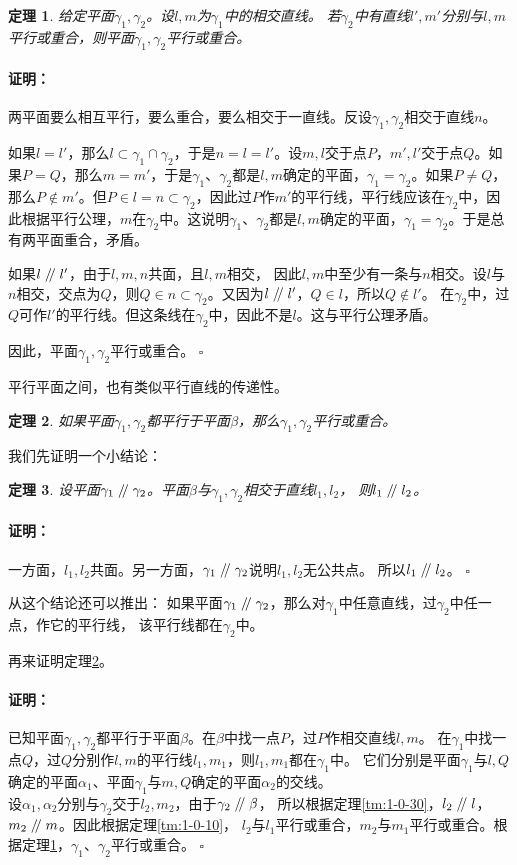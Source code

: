 \documentclass[12pt,UTF8]{ctexbook}
\newtheorem{tm}{定理}[section]
\renewenvironment{proof}{\paragraph{\textbf{证明：}}}{\hfill$\square$}
\renewcommand\parallel{\mathrel{/\mskip-4mu/}}
\begin{document}
\begin{tm}\label{tm:1-0-70}
    给定平面$\gamma_1, \gamma_2$。设$l,m$为$\gamma_1$中的相交直线。
    若$\gamma_2$中有直线$l',m'$分别与$l,m$平行或重合，则平面$\gamma_1, \gamma_2$平行或重合。
\end{tm}
\begin{proof}
    两平面要么相互平行，要么重合，要么相交于一直线。反设$\gamma_1, \gamma_2$相交于直线$n$。

    如果$l=l'$，那么$l\subset \gamma_1\cap\gamma_2$，于是$n=l=l'$。设$m,l$交于点$P$，$m',l'$交于点$Q$。如果$P=Q$，那么$m=m'$，于是$\gamma_1$、$\gamma_2$都是$l,m$确定的平面，$\gamma_1=\gamma_2$。如果$P\neq Q$，那么$P\notin m'$。但$P\in l=n\subset\gamma_2$，因此过$P$作$m'$的平行线，平行线应该在$\gamma_2$中，因此根据平行公理，$m$在$\gamma_2$中。这说明$\gamma_1$、$\gamma_2$都是$l,m$确定的平面，$\gamma_1=\gamma_2$。于是总有两平面重合，矛盾。

    如果$l\parallel l'$，由于$l,m,n$共面，且$l,m$相交，
    因此$l,m$中至少有一条与$n$相交。设$l$与$n$相交，交点为$Q$，则$Q\in n\subset\gamma_2$。又因为$l\parallel l'$，$Q\in l$，所以$Q\notin l'$。
    在$\gamma_2$中，过$Q$可作$l'$的平行线。但这条线在$\gamma_2$中，因此不是$l$。这与平行公理矛盾。

    因此，平面$\gamma_1, \gamma_2$平行或重合。
\end{proof}

平行平面之间，也有类似平行直线的传递性。
\begin{tm}\label{tm:1-0-80}
如果平面$\gamma_1,\gamma_2$都平行于平面$\beta$，那么$\gamma_1,\gamma_2$平行或重合。
\end{tm}
我们先证明一个小结论：
\begin{tm}\label{tm:1-0-90}
    设平面$\gamma_1\parallel \gamma_2$。平面$\beta$与$\gamma_1,\gamma_2$相交于直线$l_1,l_2$，
    则$l_1\parallel l_2$。
\end{tm}
\begin{proof}
    一方面，$l_1,l_2$共面。另一方面，$\gamma_1\parallel \gamma_2$说明$l_1,l_2$无公共点。
    所以$l_1\parallel l_2$。
\end{proof}

从这个结论还可以推出：
如果平面$\gamma_1\parallel \gamma_2$，那么对$\gamma_1$中任意直线，过$\gamma_2$中任一点，作它的平行线，
该平行线都在$\gamma_2$中。

再来证明定理\ref{tm:1-0-80}。
\begin{proof}
    已知平面$\gamma_1,\gamma_2$都平行于平面$\beta$。在$\beta$中找一点$P$，过$P$作相交直线$l,m$。
    在$\gamma_1$中找一点$Q$，过$Q$分别作$l,m$的平行线$l_1,m_1$，则$l_1,m_1$都在$\gamma_1$中。
    它们分别是平面$\gamma_1$与$l,Q$确定的平面$\alpha_1$、平面$\gamma_1$与$m,Q$确定的平面$\alpha_2$的交线。\\
    设$\alpha_1,\alpha_2$分别与$\gamma_2$交于$l_2,m_2$，由于$\gamma_2\parallel \beta$，
    所以根据定理\ref{tm:1-0-30}，$l_2\parallel l$，$m_2\parallel m$。因此根据定理\ref{tm:1-0-10}，
    $l_2$与$l_1$平行或重合，$m_2$与$m_1$平行或重合。根据定理\ref{tm:1-0-70}，$\gamma_1$、$\gamma_2$平行或重合。
\end{proof}
\end{document}
